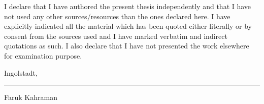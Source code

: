 
I declare that I have authored the present thesis independently and that I have not used any other sources/resources than the ones declared here. I have explicitly indicated all the material which has been quoted either literally or by consent from the sources used and I have marked verbatim and indirect quotations as such. I also declare that I have not presented the work elsewhere for examination purpose.

\vspace*{2.5cm}
	
Ingolstadt, \rule{0.3\textwidth}{0.4pt}	

	
Faruk Kahraman
